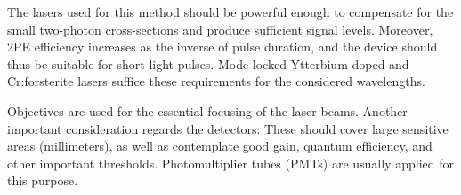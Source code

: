 The lasers used for this method should be powerful enough to compensate for the small two-photon cross-sections and produce sufficient signal levels. Moreover, 2PE efficiency increases as the inverse of pulse duration, and the device should thus be suitable for short light pulses. Mode-locked Ytterbium-doped and Cr:forsterite lasers suffice these requirements for the considered wavelengths.

Objectives are used for the essential focusing of the laser beams. Another important consideration regards the detectors: These should cover large sensitive areas (millimeters), as well as contemplate good gain, quantum efficiency, and other important thresholds. Photomultiplier tubes (PMTs) are usually applied for this purpose.